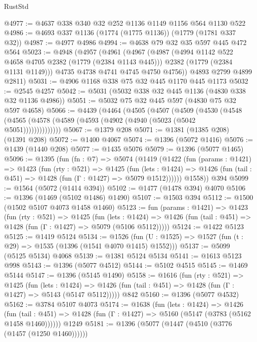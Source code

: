 \begin{lexlean}{RustStd}
\begin{coremodule}
@4977 := @4637 @338 @340 @32 @252 @1136 @1149 @1156 @564 @1130 @522
@4986 := @4693 @337 @1136 (@1774 (@1775 @1136)) (@1779 (@1781 @337 @32))
@4987 := @4977 @4986
@4994 := @4638 @79 @32 @35 @597 @445 @472 @564
@5023 := @4948
    (@4957
      (@4961
        (@4967
          (@4987
            (@4994 @1142 @522 @4658 @4705 @2382 (@1779 (@2384 @1143 @445)))
            @2382
            (@1779 (@2384 @1131 @1149)))
          @4735
          @4738
          @4741
          @4745
          @4750
          @4756))
      @4893
      @2799
      @4899
      @2811)
@5031 := @4906 @1168 @338 @75 @32 @445 @1170 @445 @1173
@5032 := @2545 @4257
@5042 := @5031 (@5032 @338 @32 @445 @1136 (@4830 @338 @32 @1136 @4986))
@5051 := @5032 @75 @32 @445 @597 (@4830 @75 @32 @597 @4658)
@5066 := @4439
    (@4464
      (@4505
        (@4507
          (@4509
            (@4530
              (@4548 (@4565 (@4578 (@4589 (@4593 (@4902 (@4940 (@5023 (@5042 @5051))))))))))))))
@5067 := @1379 @208
@5071 := @1381 (@1385 @208) (@1391 @208)
@5072 := @1400 @4067
@5074 := @1396 (@5072 @1416)
@5076 := @1439 (@1440 @208)
@5077 := @1435 @5076
@5079 := @1396 (@5077 @1465)
@5096 := @1395
    (fun (fn : @7) =>
    @5074
      (@1419
        (@1422
          (fun (params : @1421) =>
          @1423
            (fun (rty : @521) =>
            @1425
              (fun (lets : @1424) =>
              @1426 (fun (tail : @451) => @1428 (fun (Γ : @1427) => @5079 @1512))))))
        @1558))
    @394
@5099 := @1564 (@5072 (@1414 @394))
@5102 := @1477 (@1478 @394) @4070
@5106 := @1396 (@1469 (@5102 @1486) @1490)
@5107 := @1503 @394
@5112 := @1500 (@1502 @5107 @4073 @1458 @1460)
@5123 := fun (params : @1421) =>
  @1423
    (fun (rty : @521) =>
    @1425
      (fun (lets : @1424) =>
      @1426 (fun (tail : @451) => @1428 (fun (Γ : @1427) => @5079 (@5106 @5112)))))
@5124 := @1422 @5123
@5125 := @1419 @5124
@5134 := @1526 (fun (U : @1525) => @1527 (fun (t : @29) => @1535 (@1396 (@1541 @4070 @1415) @1552)))
@5137 := @5099 (@5125 @5134) @4068
@5139 := @1381 @5124 @5134
@5141 := @1613 @5123 @998
@5143 := @1396 (@5077 @4512)
@5144 := @5102 @4515
@5145 := @1469 @5144
@5147 := @1396 (@5145 @1490)
@5158 := @1616
    (fun (rty : @521) =>
    @1425
      (fun (lets : @1424) =>
      @1426 (fun (tail : @451) => @1428 (fun (Γ : @1427) => @5143 (@5147 @5112)))))
    @842
@5160 := @1396 (@5077 @4532)
@5162 := @3784 @5107 @4073
@5174 := @1638
    (fun (lets : @1424) =>
    @1426
      (fun (tail : @451) => @1428 (fun (Γ : @1427) => @5160 (@5147 (@3783 (@5162 @1458 @1460))))))
    @1249
@5181 := @1396 (@5077 (@1447 (@4510 (@3776 (@1457 (@1250 @1460))))))

\end{coremodule}
\end{lexlean}
